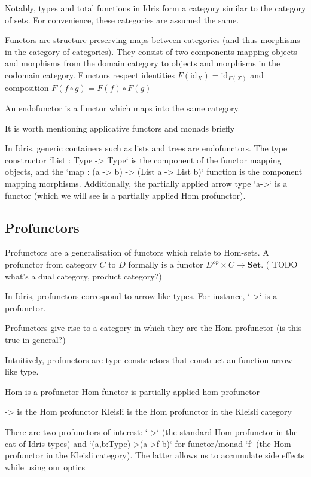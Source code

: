 \documentclass[]{report}
\begin{document}
Notably, types and total functions in Idris form a category similar to the category of sets. For convenience, these categories are assumed the same.

Functors are structure preserving maps between categories (and thus morphisms in the category of categories). They consist of two components mapping objects and morphisms from the domain category to objects and morphisms in the codomain category. Functors respect identities $F(\text{id}_X)=\text{id}_{F(X)}$ and composition $F(f\circ g)=F(f)\circ F(g)$

An endofunctor is a functor which maps into the same category.

It is worth mentioning applicative functors and monads briefly

In Idris, generic containers such as lists and trees are endofunctors. The type constructor `List : Type -> Type` is the component of the functor mapping objects, and the `map : (a -> b) -> (List a -> List b)` function is the component mapping morphisms. Additionally, the partially applied arrow type `a->` is a functor (which we will see is a partially applied Hom profunctor).

\subsection{Profunctors}

Profunctors are a generalisation of functors which relate to Hom-sets. A profunctor from category $C$ to $D$ formally is a functor $D^{op}\times C\to\mathbf{Set}$. ( TODO what's a dual category, product category?)

In Idris, profunctors correspond to arrow-like types. For instance, `->` is a profunctor. 

Profunctors give rise to a category in which they are the Hom profunctor (is this true in general?)

Intuitively, profunctors are type constructors that construct an function arrow like type.

Hom is a profunctor
Hom functor is partially applied hom profunctor

-> is the Hom profunctor
Kleisli is the Hom profunctor in the Kleisli category

There are two profunctors of interest: `->` (the standard Hom profunctor in the cat of Idris types) and `(a,b:Type)->(a->f b)` for functor/monad `f` (the Hom profunctor in the Kleisli category). The latter allows us to accumulate side effects while using our optics
\end{document}
